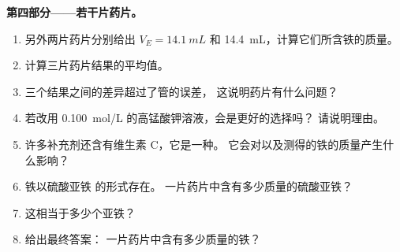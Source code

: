 \begin{problem}
\medskip
\noindent\textbf{第四部分——若干片药片。}
\begin{enumerate}[resume]
  \item 另外两片药片分别给出 $V_E = \qty{14.1}{mL}$ 和
        \qty{14.4}{mL}，计算它们所含铁的质量。
  \item 计算三片药片结果的平均值。
  \item 三个结果之间的差异超过了管的误差，
        这说明药片有什么问题？
  \item 若改用 \qty{0.100}{mol/L} 的高锰酸钾溶液，会是更好的选择吗？
        请说明理由。
  \item 许多补充剂还含有维生素 C，它是一种。
        它会对以及测得的铁的质量产生什么影响？
  \item 铁以硫酸亚铁  的形式存在。
        一片药片中含有多少质量的硫酸亚铁？
  \item 这相当于多少个亚铁？
  \item 给出最终答案：
        一片药片中含有多少质量的铁？
\end{enumerate}
\end{problem}
